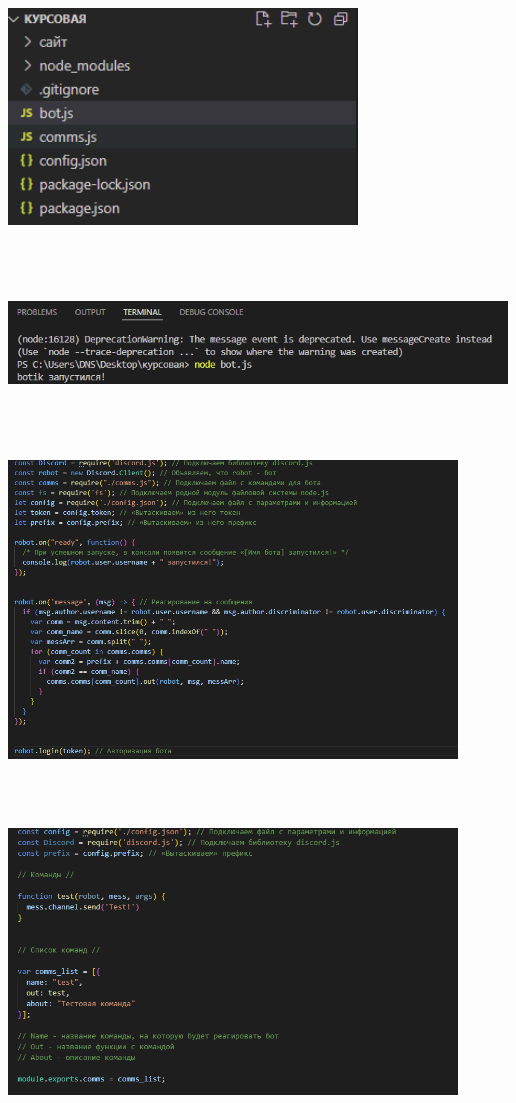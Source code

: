 \documentclass[a4paper,12pt]{article}
\begin{document}
\centerline{\includegraphics[width = 350px]{pictures/papki.png}} \\
\vspace{10mm}
\centerline{\includegraphics[width = 500px,height = 130px]{pictures/zap.png}} \\
\vfill
\newpage
\centerline{\includegraphics[width = 450px,height = 300px]{pictures/kod.png}} \\
\vspace{10mm}
\centerline{\includegraphics[width = 450px,height = 300px]{pictures/kod2.png}}
\vfill
\end{document}
